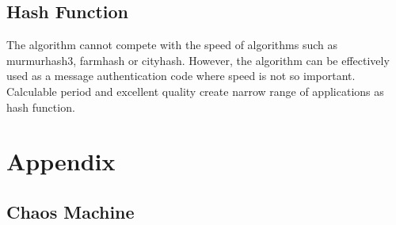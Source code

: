 \documentclass[twocolumn, a4paper, 10pt]{article}
\begin{document}
\subsection{Hash Function}

The algorithm cannot compete with the speed of algorithms such as murmurhash3, farmhash or cityhash. However, the algorithm can be effectively used as a message authentication code where speed is not so important. Calculable period and excellent quality create narrow range of applications as hash function.


\clearpage
\onecolumn

\section*{Appendix}

\subsection{Chaos Machine}
\end{document}
